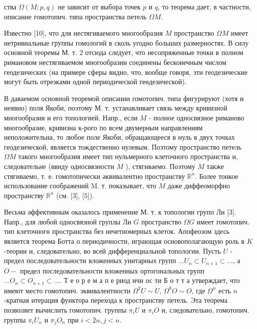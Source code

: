 \documentclass[10pt]{article}
\begin{document}
ства $\Omega(M ; p, q)$ не зависит от выбора точек $p$ и $q$, то теорема дает, в частности, описание гомотопич. типа пространства петель $\Omega M$.



Известно [10], что для нестягиваемого многообразия $M$ пространство $\Omega M$ имеет нетривиальные группы гомологий в сколь угодно больших размерностях. В силу основной теоремы М. т. 2 отсюда следует, что несопряженные точки в полном римановом нестягиваемом многообразии соединены бесконечным числом геодезических (на примере сферы видно, что, вообще говоря, эти геодезические могут быть отрезками одной периодической геөдезической).



В даваемом основной теоремой описании гомотопич. типа фигурируют (хотя и неявно) поля Якоби, поэтому М. т. устанавливает связь между кривизной многообразия и его топологией. Напр., если $M$ - полное односвязное риманово многообразие, кривизна к-рого по всем двумерным направлениям неположительна, то любое поле Якоби, обращающееся в нуль в двух точках геодезической, является тождественно нулевым. Поэтому пространство петель $\Omega M$ такого многообразия имеет тип нульмерного клеточного пространства и, следовательне (ввиду односвязности $M$ ), стягиваемо. Поэтому $M$ также стягиваемо, т. е. гомотопически әквивалентно пространству $\mathbb{R}^{n}$. Более тонкое использование соображений M. т. показывает, что $M$ даже диффеоморфно пространству $\mathbb{R}^{n}$ (см. [3], [5]).



Весьма әффективным оказалось применение М. т. к топологии групп Ли [3]. Напр., для любой односвязной груплы Ли $G$ пространство $\Omega G$ имеет гомотопич. тип клеточногө пространства без нечетномерных клеток. Апофеозом здесь является теорема Ботта о периодичности, играющая основополагающую роль в $K$-теории и, следовательно, во всей дифференциальной топологии. Пусть $U$ - предел последовательности вложенных унитарных групп $\ldots U_{n} \subset U_{n+1} \subset \ldots$, а $O-$ предел последовательности вложенных ортогональных групп $\ldots O_{n} \subset O_{n+1} \subset \ldots$. Т е о р е м а п е риод ичн ос ти Б о т т а утверждает, что имеют место гомотопич. эквивалентности $\Omega^{2} U \sim U$, $\Omega^{8} O \sim O$, где $\Omega^{n}$ есть $n$-кратная итерация функтора перехода к пространству петель. Эта теорема позволяет вычислить гомотопич. группы $\pi_{i} U$ и $\pi_{i} O$ и, следовательно, гомотопич. группы $\pi_{i} U_{n}$ и $\pi_{j} O_{n}$ при $i<2 n, j<n$.
\end{document}
